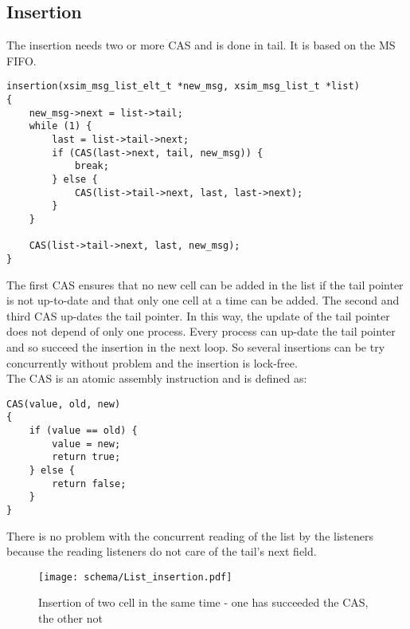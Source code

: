 \subsection{Insertion}
The insertion needs two or more CAS and is done in tail.
It is based on the MS FIFO.
\begin{verbatim}
insertion(xsim_msg_list_elt_t *new_msg, xsim_msg_list_t *list)
{
    new_msg->next = list->tail;
    while (1) {
        last = list->tail->next;
        if (CAS(last->next, tail, new_msg)) {
            break;
        } else {
            CAS(list->tail->next, last, last->next);
        }
    }
        
    CAS(list->tail->next, last, new_msg);
}
\end{verbatim}

The first CAS ensures that no new cell can be added in the list if the tail pointer is
not up-to-date and that only one cell at a time can be added. 
The second and third CAS up-dates the tail pointer. In this way, the update of the
tail pointer does not depend of only one process.
Every process can up-date the tail pointer and so succeed the insertion in the next loop.
So several insertions can be try concurrently without problem and the insertion is lock-free.\\

The CAS is an atomic assembly instruction and is defined as:
\begin{verbatim}
CAS(value, old, new)
{
    if (value == old) {
        value = new;
        return true;
    } else {
        return false;
    }
}
\end{verbatim}


There is no problem with the concurrent reading of the list by the listeners 
because the reading listeners do not care of the tail's next field. 


\begin{figure}[h]
\begin{center}
    \texttt{[image: schema/List\_insertion.pdf]}
	\caption{Insertion of two cell in the same time - one has succeeded the CAS, the other not}
	\label{List_insertion}
\end{center}
\end{figure}


